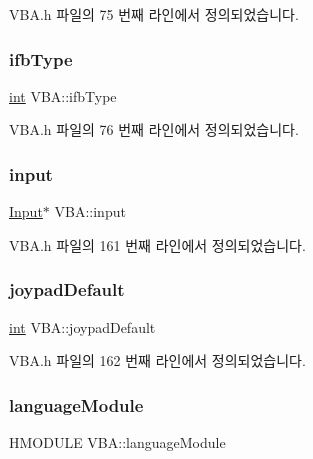 V\+B\+A.\+h 파일의 75 번째 라인에서 정의되었습니다.

\mbox{\label{class_v_b_a_a4349741c5cec8852f8914093484418e8}} 
\subsubsection{\texorpdfstring{ifb\+Type}{ifbType}}
{\footnotesize\ttfamily \mbox{\hyperlink{_util_8cpp_a0ef32aa8672df19503a49fab2d0c8071}{int}} V\+B\+A\+::ifb\+Type}



V\+B\+A.\+h 파일의 76 번째 라인에서 정의되었습니다.

\mbox{\label{class_v_b_a_aaab971cb5d67a69e1a26502d15a4dc60}} 
\subsubsection{\texorpdfstring{input}{input}}
{\footnotesize\ttfamily \mbox{\hyperlink{class_input}{Input}}$\ast$ V\+B\+A\+::input}



V\+B\+A.\+h 파일의 161 번째 라인에서 정의되었습니다.

\mbox{\label{class_v_b_a_af42f79cc8ea9f0f95bf4634c0b9224dd}} 
\subsubsection{\texorpdfstring{joypad\+Default}{joypadDefault}}
{\footnotesize\ttfamily \mbox{\hyperlink{_util_8cpp_a0ef32aa8672df19503a49fab2d0c8071}{int}} V\+B\+A\+::joypad\+Default}



V\+B\+A.\+h 파일의 162 번째 라인에서 정의되었습니다.

\mbox{\label{class_v_b_a_ae4c01c2d55e31b9b29a850d22e691df8}} 
\subsubsection{\texorpdfstring{language\+Module}{languageModule}}
{\footnotesize\ttfamily H\+M\+O\+D\+U\+LE V\+B\+A\+::language\+Module}



